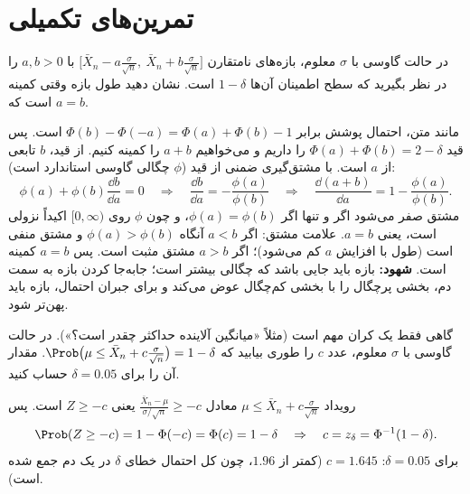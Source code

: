 \section{تمرین‌های تکمیلی}

\begin{exercise}
در حالت گاوسی با $\sigma$ معلوم، بازه‌های نامتقارن $\big[\bar X_n-a\frac{\sigma}{\sqrt n},\ \bar X_n+b\frac{\sigma}{\sqrt n}\big]$ با $a,b>0$ را در نظر بگیرید که سطح اطمینان آن‌ها $1-\delta$ است. نشان دهید طول بازه وقتی کمینه است که $a=b$.
\end{exercise}
\begin{solution}
مانند متن، احتمال پوشش برابر $\Phi(b)-\Phi(-a)=\Phi(a)+\Phi(b)-1$ است. پس قید $\Phi(a)+\Phi(b)=2-\delta$ را داریم و می‌خواهیم $a+b$ را کمینه کنیم. از قید، $b$ تابعی از $a$ است. با مشتق‌گیری ضمنی از قید ($\phi$ چگالی گاوسی استاندارد است):
\[
\phi(a)+\phi(b)\frac{\dd b}{\dd a}=0\quad\Rightarrow\quad\frac{\dd b}{\dd a}=-\frac{\phi(a)}{\phi(b)}
\quad\Rightarrow\quad\frac{\dd(a+b)}{\dd a}=1-\frac{\phi(a)}{\phi(b)} .
\]
مشتق صفر می‌شود اگر و تنها اگر $\phi(a)=\phi(b)$، و چون $\phi$ روی $[0,\infty)$ اکیداً نزولی است، یعنی $a=b$. علامت مشتق: اگر $a<b$ آنگاه $\phi(a)>\phi(b)$ و مشتق منفی است (طول با افزایش $a$ کم می‌شود)؛ اگر $a>b$ مشتق مثبت است. پس $a=b$ کمینه است. \textbf{شهود:} بازه باید جایی باشد که چگالی بیشتر است؛ جابه‌جا کردن بازه به سمت دم، بخشی پرچگال را با بخشی کم‌چگال عوض می‌کند و برای جبران احتمال، بازه باید پهن‌تر شود.
\end{solution}

\begin{exercise}
گاهی فقط یک کران مهم است (مثلاً «میانگین آلاینده حداکثر چقدر است؟»). در حالت گاوسی با $\sigma$ معلوم، عدد $c$ را طوری بیابید که $\Prob\big(\mu\le\bar X_n+c\frac{\sigma}{\sqrt n}\big)=1-\delta$. مقدار آن را برای $\delta=0.05$ حساب کنید.
\end{exercise}
\begin{solution}
رویداد $\mu\le\bar X_n+c\frac{\sigma}{\sqrt n}$ معادل $\frac{\bar X_n-\mu}{\sigma/\sqrt n}\ge-c$ یعنی $Z\ge-c$ است. پس
\[
\Prob(Z\ge-c)=1-\Phi(-c)=\Phi(c)=1-\delta\quad\Rightarrow\quad c=z_\delta=\Phi^{-1}(1-\delta).
\]
برای $\delta=0.05$: $c=1.645$ (کمتر از $1.96$، چون کل احتمال خطای $\delta$ در یک دم جمع شده است).
\end{solution}

